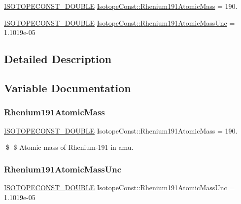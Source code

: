 \begin{DoxyCompactItemize}
\item 
\mbox{\hyperlink{group___isotope_const-_macros_ga8f45a7272ce02c0b4c65c44636ed719a}{I\+S\+O\+T\+O\+P\+E\+C\+O\+N\+S\+T\+\_\+\+D\+O\+U\+B\+LE}} \mbox{\hyperlink{group___isotope_const-_rhenium-_re191_gaaf51183a3f2ea22b14b15c01e761b9ba}{Isotope\+Const\+::\+Rhenium191\+Atomic\+Mass}} = 190.
\item 
\mbox{\hyperlink{group___isotope_const-_macros_ga8f45a7272ce02c0b4c65c44636ed719a}{I\+S\+O\+T\+O\+P\+E\+C\+O\+N\+S\+T\+\_\+\+D\+O\+U\+B\+LE}} \mbox{\hyperlink{group___isotope_const-_rhenium-_re191_gaf809ba304ced1810165b40f6703bea76}{Isotope\+Const\+::\+Rhenium191\+Atomic\+Mass\+Unc}} = 1.\+1019e-\/05
\end{DoxyCompactItemize}


\subsection{Detailed Description}


\subsection{Variable Documentation}
\mbox{\label{group___isotope_const-_rhenium-_re191_gaaf51183a3f2ea22b14b15c01e761b9ba}} 
\subsubsection{\texorpdfstring{Rhenium191\+Atomic\+Mass}{Rhenium191AtomicMass}}
{\footnotesize\ttfamily \mbox{\hyperlink{group___isotope_const-_macros_ga8f45a7272ce02c0b4c65c44636ed719a}{I\+S\+O\+T\+O\+P\+E\+C\+O\+N\+S\+T\+\_\+\+D\+O\+U\+B\+LE}} Isotope\+Const\+::\+Rhenium191\+Atomic\+Mass = 190.}

\$ \$ Atomic mass of Rhenium-\/191 in amu. \mbox{\label{group___isotope_const-_rhenium-_re191_gaf809ba304ced1810165b40f6703bea76}} 
\subsubsection{\texorpdfstring{Rhenium191\+Atomic\+Mass\+Unc}{Rhenium191AtomicMassUnc}}
{\footnotesize\ttfamily \mbox{\hyperlink{group___isotope_const-_macros_ga8f45a7272ce02c0b4c65c44636ed719a}{I\+S\+O\+T\+O\+P\+E\+C\+O\+N\+S\+T\+\_\+\+D\+O\+U\+B\+LE}} Isotope\+Const\+::\+Rhenium191\+Atomic\+Mass\+Unc = 1.\+1019e-\/05}


